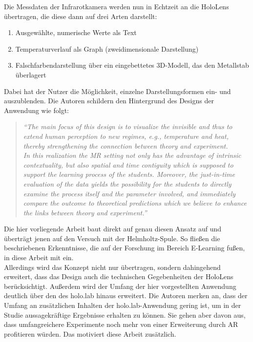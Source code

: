 Die Messdaten der Infrarotkamera werden nun in Echtzeit an die HoloLens übertragen, die diese dann auf drei Arten darstellt:
\begin{enumerate}
	\setlength{\itemsep}{-2pt}
	\item Ausgewählte, numerische Werte als Text
	\item Temperaturverlauf als Graph (zweidimensionale Darstellung)
	\item Falschfarbendarstellung über ein eingebettetes 3D-Modell, das den Metallstab überlagert
\end{enumerate}
Dabei hat der Nutzer die Möglichkeit, einzelne Darstellungsformen ein- und auszublenden. Die Autoren schildern den Hintergrund des Designs der Anwendung wie folgt:
\begin{quote}
	\textit{``The main focus of this design is to visualize the invisible and thus to extend human perception to new regimes, e.g., temperature and heat, thereby strengthening the connection between theory and experiment.\\ 
		In this realization the MR setting not only has the advantage of intrinsic contextuality, but also spatial and time contiguity which is supposed to support the learning process of the students. Moreover, the just-in-time evaluation of the data yields the possibility for the students to directly examine the process itself and the parameter involved, and immediately compare the outcome to theoretical predictions which we believe to enhance the links between theory and experiment.''}
\end{quote}

Die hier vorliegende Arbeit baut direkt auf genau diesen Ansatz auf und überträgt jenen auf den Versuch mit der Helmholtz-Spule. So fließen die beschriebenen Erkenntnisse, die auf der Forschung im Bereich E-Learning fußen, in diese Arbeit mit ein.\\

Allerdings wird das Konzept nicht nur übertragen, sondern dahingehend erweitert, dass das Design auch die technischen Gegebenheiten der HoloLens berücksichtigt. Außerdem wird der Umfang der hier vorgestellten Anwendung deutlich über den des holo.lab hinaus erweitert. Die Autoren merken an, dass der Umfang an zusätzlichen Inhalten der holo.lab-Anwendung gering ist, um in der Studie aussagekräftige Ergebnisse erhalten zu können. Sie gehen aber davon aus, dass umfangreichere Experimente noch mehr von einer Erweiterung durch AR profitieren würden. Das motiviert diese Arbeit zusätzlich.\\

